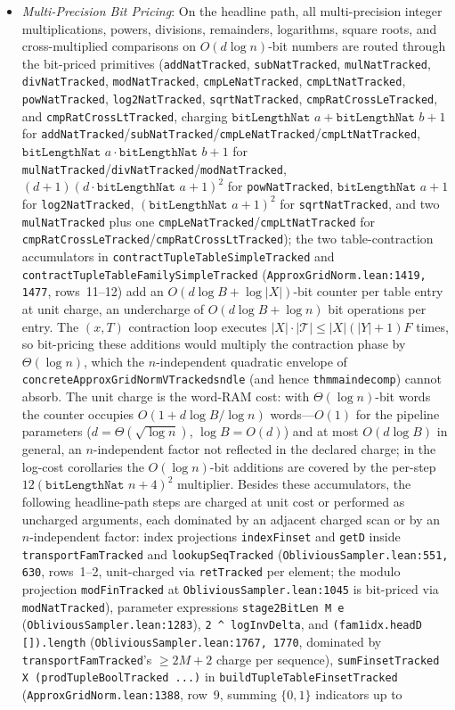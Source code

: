 \documentclass[10pt,letterpaper]{article}
\renewcommand{\_}{\origunderscore\allowbreak}
\newcommand{\code}[1]{\texttt{#1}}
\begin{document}
\begin{enumerate}
\begin{itemize}
    \item \emph{Multi-Precision Bit Pricing}: On the headline path, all multi-precision integer multiplications, powers, divisions, remainders, logarithms, square roots, and cross-multiplied comparisons on $O(d \log n)$-bit numbers are routed through the bit-priced primitives (\code{addNatTracked}, \code{subNatTracked}, \code{mulNatTracked}, \code{divNatTracked}, \code{modNatTracked}, \code{cmpLeNatTracked}, \code{cmpLtNatTracked}, \code{powNatTracked}, \code{log2NatTracked}, \code{sqrtNatTracked}, \code{cmpRatCrossLeTracked}, and \code{cmpRatCrossLtTracked}, charging $\code{bitLengthNat }a + \code{bitLengthNat }b + 1$ for \code{addNatTracked}/\code{subNatTracked}/\code{cmpLeNatTracked}/\code{cmpLtNatTracked}, $\code{bitLengthNat }a \cdot \code{bitLengthNat }b + 1$ for \code{mulNatTracked}/\code{divNatTracked}/\code{modNatTracked}, $(d+1)(d \cdot \code{bitLengthNat }a + 1)^2$ for \code{powNatTracked}, $\code{bitLengthNat }a + 1$ for \code{log2NatTracked}, $(\code{bitLengthNat }a + 1)^2$ for \code{sqrtNatTracked}, and two \code{mulNatTracked} plus one \code{cmpLeNatTracked}/\code{cmpLtNatTracked} for \code{cmpRatCrossLeTracked}/\code{cmpRatCrossLtTracked}); the two table-contraction accumulators in \code{contractTupleTableSimpleTracked} and \code{contractTupleTableFamilySimpleTracked} (\code{ApproxGridNorm.lean:1419, 1477}, rows~11--12) add an $O(d \log B + \log |X|)$-bit counter per table entry at unit charge, an undercharge of $O(d \log B + \log n)$ bit operations per entry. The $(x, T)$ contraction loop executes $|X| \cdot |\mathcal{T}| \le |X|(|Y|+1)F$ times, so bit-pricing these additions would multiply the contraction phase by $\Theta(\log n)$, which the $n$-independent quadratic envelope of \code{concreteApproxGridNormVTracked\_snd\_le} (and hence \code{thm\_main\_decomp}) cannot absorb. The unit charge is the word-RAM cost: with $\Theta(\log n)$-bit words the counter occupies $O(1 + d \log B / \log n)$ words---$O(1)$ for the pipeline parameters ($d = \Theta(\sqrt{\log n})$, $\log B = O(d)$) and at most $O(d \log B)$ in general, an $n$-independent factor not reflected in the declared charge; in the log-cost corollaries the $O(\log n)$-bit additions are covered by the per-step $12(\code{bitLengthNat }n + 4)^2$ multiplier. Besides these accumulators, the following headline-path steps are charged at unit cost or performed as uncharged arguments, each dominated by an adjacent charged scan or by an $n$-independent factor: index projections \code{indexFinset} and \code{getD} inside \code{transportFamTracked} and \code{lookupSeqTracked} (\code{ObliviousSampler.lean:551, 630}, rows~1--2, unit-charged via \code{retTracked} per element; the modulo projection \code{modFinTracked} at \code{ObliviousSampler.lean:1045} is bit-priced via \code{modNatTracked}), parameter expressions \code{stage2BitLen M e} (\code{ObliviousSampler.lean:1283}), \code{2 \^{} logInvDelta}, and \code{(fam1\_idx.headD []).length} (\code{ObliviousSampler.lean:1767, 1770}, dominated by \code{transportFamTracked}'s $\ge 2M+2$ charge per sequence), \code{sumFinsetTracked X (prodTupleBoolTracked ...)} in \code{buildTupleTableFinsetTracked} (\code{ApproxGridNorm.lean:1388}, row~9, summing $\{0, 1\}$ indicators up to 
\end{itemize}
\end{enumerate}
\end{document}
